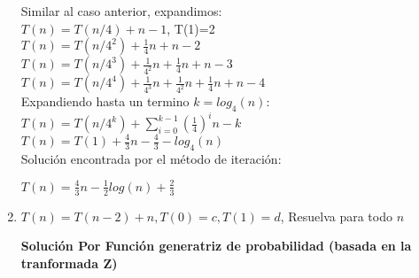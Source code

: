 \documentclass{article}
\begin{document}
\begin{enumerate}[label=\textbf{\alph*.}]
  Similar al caso anterior, expandimos:\\
  $T(n) = T(n/4) + n - 1$, T(1)=2\\
  $T(n) = T(n/4^2) + \frac{1}{4}n + n - 2$\\
  $T(n) = T(n/4^3) + \frac{1}{4^2}n + \frac{1}{4}n + n - 3$\\
  $T(n) = T(n/4^4) + \frac{1}{4^3}n + \frac{1}{4^2}n + \frac{1}{4}n + n - 4$\\
  Expandiendo hasta un termino $k=log_4(n)$:\\
  $T(n) = T(n/4^k) + \sum_{i=0}^{k-1}{(\frac{1}{4})^i}n - k$\\
  $T(n) = T(1) + \frac{4}{3}n - \frac{4}{3} - log_4(n)$\\
  
  Soluci\'on encontrada por el m\'etodo de iteración:
  \begin{center}
  	$T(n) = \frac{4}{3}n - \frac{1}{2}log(n) + \frac{2}{3}$\\
  \end{center}
  
  \item $T(n)=T(n-2)+n, T(0)=c,T(1)=d$, Resuelva para todo $n$
  
  \textbf{Soluci\'on Por Funci\'on generatriz de probabilidad (basada en la tranformada Z)}
  

\end{enumerate}
\end{document}
